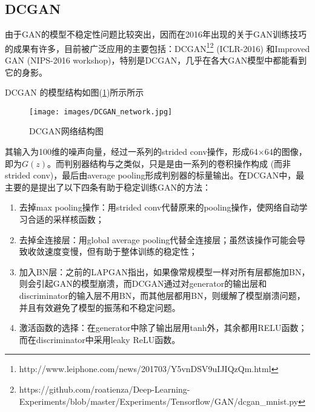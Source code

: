     \subsection{DCGAN}
        \par
        由于GAN的模型不稳定性问题比较突出，因而在2016年出现的关于GAN训练技巧的成果有许多，目前被广泛应用的主要包括：DCGAN\footnote{http://www.leiphone.com/news/201703/Y5vnDSV9uIJIQzQm.html}\footnote{https://github.com/roatienza/Deep-Learning-Experiments/blob/master/Experiments/Tensorflow/GAN/dcgan\_mnist.py} (ICLR-2016) 和Improved GAN (NIPS-2016 workshop)，特别是DCGAN，几乎在各大GAN模型中都能看到它的身影。
        \par
        DCGAN\cite{2015.Radford} 的模型结构如图(\ref{fig:DCGAN网络结构图})所示所示
                \begin{figure}[H]
                \centering
                \texttt{[image: images/DCGAN\_network.jpg]}
                \caption{DCGAN网络结构图}
                \label{fig:DCGAN网络结构图}
                \end{figure}
        其输入为100维的噪声向量，经过一系列的strided conv操作，形成64$\times$64的图像，即为$G(z)$。而判别器结构与之类似，只是是由一系列的卷积操作构成 (而非strided conv)，最后由average pooling形成判别器的标量输出。在DCGAN\cite{2015.Radford}中，最主要的是提出了以下四条有助于稳定训练GAN的方法：
        \begin{enumerate}
        \item 去掉max pooling操作：用strided conv代替原来的pooling操作，使网络自动学习合适的采样核函数；
        \item 去掉全连接层：用global average pooling代替全连接层；虽然该操作可能会导致收敛速度变慢，但有助于整体训练的稳定性；
        \item 加入BN层：之前的LAPGAN\cite{2015.Denton}指出，如果像常规模型一样对所有层都施加BN，则会引起GAN的模型崩溃，而DCGAN通过对generator的输出层和discriminator的输入层不用BN，而其他层都用BN，则缓解了模型崩溃问题，并且有效避免了模型的振荡和不稳定问题。
        \item 激活函数的选择：在generator中除了输出层用tanh外，其余都用RELU函数；而在discriminator中采用leaky ReLU函数。
        \end{enumerate}

